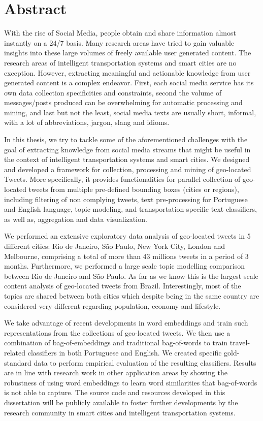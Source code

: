 \chapter*{Abstract}

With the rise of Social Media, people obtain and share information almost instantly on a 24/7 basis. Many research areas have tried to gain valuable insights into these large volumes of freely available user generated content. The research areas of intelligent transportation systems and smart cities are no exception. However, extracting meaningful and actionable knowledge from user generated content is a complex endeavor. First, each social media service has its own data collection specificities and constraints, second the volume of messages/posts produced can be overwhelming for automatic processing and mining, and last but not the least, social media texts are usually short, informal, with a lot of abbreviations, jargon, slang and idioms.
 
In this thesis, we try to tackle some of the aforementioned challenges with the goal of extracting knowledge from social media streams that might be useful in the context of intelligent transportation systems and smart cities. We designed and developed a framework for collection, processing and mining of geo-located Tweets. More specifically, it provides functionalities for parallel collection of geo-located tweets from multiple pre-defined bounding boxes (cities or regions), including filtering of non complying tweets, text pre-processing for Portuguese and English language, topic modeling, and transportation-specific text classifiers, as well as, aggregation and data visualization.

We performed an extensive exploratory data analysis of geo-located tweets in 5 different cities: Rio de Janeiro, São Paulo, New York City, London and Melbourne, comprising a total of more than 43 millions tweets in a period of 3 months. Furthermore, we performed a large scale topic modelling comparison between Rio de Janeiro and São Paulo. As far as we know this is the largest scale content analysis of geo-located tweets from Brazil. Interestingly, most of the topics are shared between both cities which despite being in the same country are considered very different regarding population, economy and lifestyle.

We take advantage of recent developments in word embeddings and train such representations from the collections of geo-located tweets. We then use a combination of bag-of-embeddings and traditional bag-of-words to train travel-related classifiers in both Portuguese and English. We created specific gold-standard data to perform empirical evaluation of the resulting classifiers. Results are in line with research work in other application areas by showing the robustness of using word embeddings to learn word similarities that bag-of-words is not able to capture. The source code and resources developed in this dissertation will be publicly available to foster further developments by the research community in smart cities and intelligent transportation systems.


